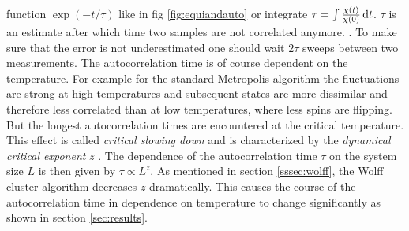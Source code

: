     function \(\exp(-t/\tau)\) like in fig \ref{fig:equiandauto}
    or integrate \(\tau = \int \frac{\chi(t)}{\chi(0)} \,\mathrm{d} t\).
    \(\tau\) is an estimate after which time two samples are not
    correlated anymore. \cite[S. ??]{NewmanBarkema1999} \cite[S. 150f]{Katzgraber2011}.
    To make sure that the error is not underestimated one should wait
    \(2\tau\) sweeps between two measurements.
    The autocorrelation time is of course dependent on the temperature.
    For example for the standard Metropolis algorithm the fluctuations
    are strong at high temperatures and subsequent
    states are more dissimilar and therefore less correlated than at low
    temperatures, where less spins are flipping. But the longest
    autocorrelation times are encountered at the critical temperature.
    This effect is called \emph{critical slowing down} and is
    characterized by the \emph{dynamical critical exponent} \(z\)
    \cite{SwendsenWang1987}. The dependence of the autocorrelation time
    \(\tau\) on the system size \(L\) is then given by \(\tau \propto L^z\).
    As mentioned in section \ref{sssec:wolff}, the Wolff cluster algorithm
    decreases \(z\) dramatically. This causes the course of the autocorrelation
    time in dependence on temperature to change significantly as shown in
    section \ref{sec:results}.
